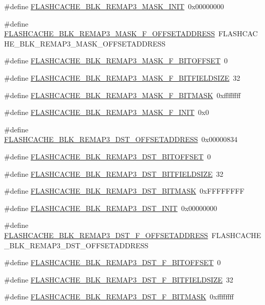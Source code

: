 \begin{DoxyCompactItemize}
\#define \hyperlink{a00550_aa4be8b85883062b5f9d0e68f8c8e3959}{FLASHCACHE\_\-BLK\_\-REMAP3\_\-MASK\_\-INIT}~0x00000000
\item 
\#define \hyperlink{a00550_ab36a8b2c6dd999b2388f69074f04bb8d}{FLASHCACHE\_\-BLK\_\-REMAP3\_\-MASK\_\-F\_\-OFFSETADDRESS}~FLASHCACHE\_\-BLK\_\-REMAP3\_\-MASK\_\-OFFSETADDRESS
\item 
\#define \hyperlink{a00550_a95ef79cabfa535002946774ee18c38a2}{FLASHCACHE\_\-BLK\_\-REMAP3\_\-MASK\_\-F\_\-BITOFFSET}~0
\item 
\#define \hyperlink{a00550_ab002aed4c25ab31ad41cb1b57e0aab93}{FLASHCACHE\_\-BLK\_\-REMAP3\_\-MASK\_\-F\_\-BITFIELDSIZE}~32
\item 
\#define \hyperlink{a00550_a9ed399e279eecefdd6a24ac200d1b1d3}{FLASHCACHE\_\-BLK\_\-REMAP3\_\-MASK\_\-F\_\-BITMASK}~0xffffffff
\item 
\#define \hyperlink{a00550_a3866175680de46765b35f622c43eac04}{FLASHCACHE\_\-BLK\_\-REMAP3\_\-MASK\_\-F\_\-INIT}~0x0
\item 
\#define \hyperlink{a00550_a79b5fdd024f4d3ac48d44f5a5629c88b}{FLASHCACHE\_\-BLK\_\-REMAP3\_\-DST\_\-OFFSETADDRESS}~0x00000834
\item 
\#define \hyperlink{a00550_a1f3326424c5758422c90dc339a210d97}{FLASHCACHE\_\-BLK\_\-REMAP3\_\-DST\_\-BITOFFSET}~0
\item 
\#define \hyperlink{a00550_a3f427ac1da5c31faec3959bfab655341}{FLASHCACHE\_\-BLK\_\-REMAP3\_\-DST\_\-BITFIELDSIZE}~32
\item 
\#define \hyperlink{a00550_a5a0b178c0ad5aaebc49d0aa008ff96d6}{FLASHCACHE\_\-BLK\_\-REMAP3\_\-DST\_\-BITMASK}~0xFFFFFFFF
\item 
\#define \hyperlink{a00550_a59a31d6f20dd05b00ce7680c53d33569}{FLASHCACHE\_\-BLK\_\-REMAP3\_\-DST\_\-INIT}~0x00000000
\item 
\#define \hyperlink{a00550_add9ac699d37e541fa46dff4f5bb73bc0}{FLASHCACHE\_\-BLK\_\-REMAP3\_\-DST\_\-F\_\-OFFSETADDRESS}~FLASHCACHE\_\-BLK\_\-REMAP3\_\-DST\_\-OFFSETADDRESS
\item 
\#define \hyperlink{a00550_aeeea29283efda13b4db7ee4642526718}{FLASHCACHE\_\-BLK\_\-REMAP3\_\-DST\_\-F\_\-BITOFFSET}~0
\item 
\#define \hyperlink{a00550_a4958a196ce06eed96fe5f94dbe4d2815}{FLASHCACHE\_\-BLK\_\-REMAP3\_\-DST\_\-F\_\-BITFIELDSIZE}~32
\item 
\#define \hyperlink{a00550_a018d220bac85b3a096e85f64b3ca82b6}{FLASHCACHE\_\-BLK\_\-REMAP3\_\-DST\_\-F\_\-BITMASK}~0xffffffff
\item 

\end{DoxyCompactItemize}
